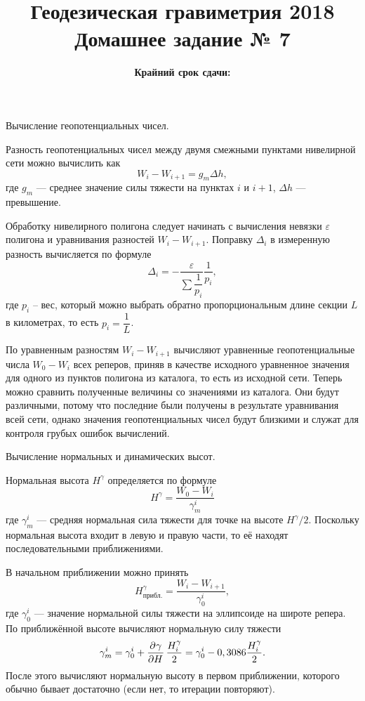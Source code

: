 \documentclass[11pt, a4paper,addpoints]{exam}
\title{{\Large Геодезическая гравиметрия 2018}\\ 
    {\bf\Large Домашнее задание № 7}}
\author{}
\date{\normalsize\bf Крайний срок сдачи: \DTMusedate{deadline}}
\theoremstyle{remark}
\renewcommand{\epsilon}{\ensuremath{\varepsilon}}
\begin{document}
\maketitle
\thispagestyle{empty}
\begin{questions}
    \question Вычисление геопотенциальных чисел.

    Разность геопотенциальных чисел между двумя смежными пунктами нивелирной сети можно вычислить как
    \begin{equation*}
        W_i - W_{i + 1} = g_m \Delta h,
    \end{equation*}
    где $g_m$ --- среднее значение силы тяжести на пунктах $i$ и ${i+1}$, $\Delta h$ --- превышение.

    Обработку нивелирного полигона следует начинать с вычисления невязки $\epsilon$ полигона и
    уравнивания разностей $W_i - W_{i+1}$. Поправку $\Delta_i$ в измеренную разность вычисляется по
    формуле
    \begin{equation*}
        \Delta_i = -\dfrac{\epsilon}{\sum\dfrac{1}{p_i}} \dfrac{1}{p_i},
    \end{equation*}
    где $p_i$ -- вес, который можно выбрать обратно пропорциональным длине секции $L$ в километрах, то есть
    $p_i = \dfrac{1}{L}$.

    По уравненным разностям $W_i - W_{i+1}$ вычисляют уравненные геопотенциальные числа $W_0 - W_i$ 
    всех реперов, приняв в качестве исходного уравненное значения для одного из пунктов полигона из
    каталога, то есть из исходной сети. Теперь можно сравнить полученные величины со значениями из
    каталога. Они будут различными, потому что последние были получены в результате уравнивания всей
    сети, однако значения геопотенциальных чисел будут близкими и служат для контроля грубых ошибок
    вычислений.

    \question Вычисление нормальных и динамических высот.

    Нормальная высота $H^\gamma$ определяется по формуле
    \begin{equation*}
        H^\gamma = \dfrac{W_0 - W_i}{\gamma_m^i}
    \end{equation*}
    где $\gamma_m^i$ --- средняя нормальная сила тяжести для точке на высоте $H^\gamma / 2$. Поскольку
    нормальная высота входит в левую и правую части, то её находят последовательными приближениями. 

    В начальном приближении можно принять
    \begin{equation*}
        H^\gamma_{\textrm{прибл.}} = \dfrac{W_i - W_{i+1}}{\gamma_0^i},
    \end{equation*}
    где $\gamma_0^i$ --- значение нормальной силы тяжести на эллипсоиде на широте репера. По приближённой высоте
    вычисляют нормальную силу тяжести
    \begin{equation*}
        \gamma_m^i = \gamma_0^i + \dpd{\gamma}{H} \dfrac{H_i^\gamma}{2} =
        \gamma_0^i - 0,3086 \dfrac{H_i^\gamma}{2}.
    \end{equation*}
    После этого вычисляют нормальную высоту в первом приближении, которого обычно бывает достаточно
    (если нет, то итерации повторяют).


\end{questions}
\end{document}
